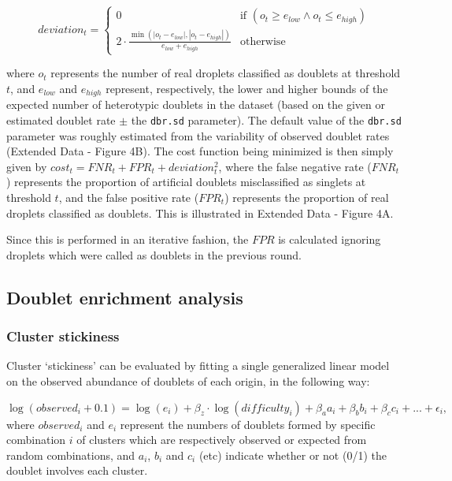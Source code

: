 \documentclass[10pt,a4paper,twocolumn]{article}
\begin{document}
\[
deviation_t = \begin{cases}
  0 & 
    \text{if } (o_t \geq e_{low} \land o_t \leq e_{high}) \\
  2 \cdot \frac{
  \min(|o_t-e_{low}|, |o_t-e_{high}|)
}{e_{low} + e_{high}} & \text{otherwise}
\end{cases}
\]

where \(o_t\) represents the number of real droplets classified as doublets at threshold \(t\), and \(e_{low}\) and \(e_{high}\) represent, respectively, the lower and higher bounds of the expected number of heterotypic doublets in the dataset (based on the given or estimated doublet rate \(\pm\) the \texttt{dbr.sd} parameter).
The default value of the \texttt{dbr.sd} parameter was roughly estimated from the variability of observed doublet rates (Extended Data - Figure 4B).
The cost function being minimized is then simply given by \(cost_t = FNR_t + FPR_t + deviation_t^2\), where the false negative rate (\(FNR_t\)) represents the proportion of artificial doublets misclassified as singlets at threshold \(t\), and the false positive rate (\(FPR_t\)) represents the proportion of real droplets classified as doublets. This is illustrated in Extended Data - Figure 4A.

Since this is performed in an iterative fashion, the \(FPR\) is calculated ignoring droplets which were called as doublets in the previous round.

\subsection{Doublet enrichment analysis}

\subsubsection{Cluster stickiness}

Cluster `stickiness' can be evaluated by fitting a single generalized linear model on the observed abundance of doublets of each origin, in the following way:

\[
\log(observed_i+0.1) = \log(e_i) + \beta_z \cdot \log(difficulty_i) +
\beta_a a_i + \beta_b b_i + \beta_c c_i + ... +\epsilon_i ,
\]
where \(observed_i\) and \(e_i\) represent the numbers of doublets formed by specific combination \(i\) of clusters which are respectively observed or expected from random combinations, and \(a_i\), \(b_i\) and \(c_i\) (etc) indicate whether or not (0/1) the doublet involves each cluster.
\end{document}
